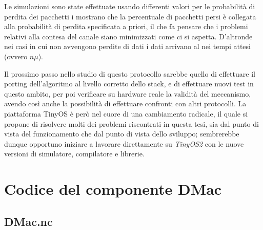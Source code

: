 \documentclass[twoside,11pt,a4paper,italian,openany]{book}
\begin{document}
Le simulazioni sono state effettuate usando differenti valori per le probabilità di perdita 
dei pacchetti i mostrano che la percentuale di pacchetti persi è collegata  
alla probabilità di perdita specificata a priori, il che fa pensare che i problemi relativi alla contesa del canale siano minimizzati come ci si aspetta. D'altronde nei casi in cui non avvengono
perdite di dati i dati arrivano al \sink nei tempi attesi (ovvero $n\mu$).  


Il prossimo passo nello studio di questo protocollo sarebbe quello di effettuare il 
porting dell'algoritmo al livello corretto dello stack, e di effettuare nuovi test in questo 
ambito, per poi verificare su hardware reale la validità del meccanismo, avendo così anche la 
possibilità di effettuare confronti con altri protocolli. 
La piattaforma TinyOS è però nel cuore di una cambiamento radicale\cite{tos2}, il quale 
si propone di risolvere molti dei problemi riscontrati in questa tesi, sia dal punto di vista 
del funzionamento che dal punto di vista dello sviluppo; sembrerebbe dunque opportuno 
iniziare a lavorare direttamente su \emph{TinyOS2} con le nuove versioni di simulatore, 
compilatore e librerie. 
\appendix
\lstset{
  basicstyle=\small,
  numbers=left, 
  stepnumber=5, 
  numbersep=8pt,
  frame=L,
  }
\chapter{Codice del componente DMac}
%
\section{DMac.nc}

\end{document}
